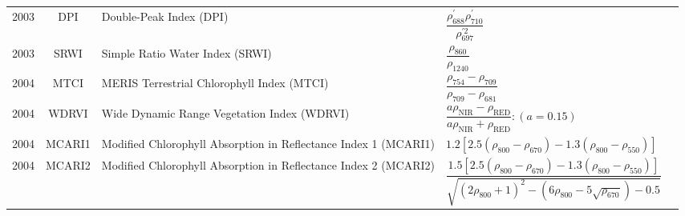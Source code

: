 \documentclass[10pt]{article}
\begin{document}
\begin{ThreePartTable}
\begin{longtable}{c c m{2.80in} M{2.80in} M{1.5in}}
  2003 & DPI     & Double-Peak Index (DPI)                                                        & $\dfrac{\rho^\prime_{688}\rho^\prime_{710}}{\rho^{\prime2}_{697}}$                                                                                                                                                                                                                      & \citet{Zarco-Tejada2003}                            \\
  2003 & SRWI    & Simple Ratio Water Index (SRWI)                                                & $\dfrac{\rho_{860}}{\rho_{1240}}$                                                                                                                                                                                                                                                       & \citet{Zarco-Tejada2003b}                           \\
  2004 & MTCI    & MERIS Terrestrial Chlorophyll Index (MTCI)                                     & $\dfrac{\rho_{754}-\rho_{709}}{\rho_{709}-\rho_{681}}$                                                                                                                                                                                                                                  & \citet{Dash2004}                                    \\
  2004 & WDRVI   & Wide Dynamic Range Vegetation Index (WDRVI)                                    & $\dfrac{a\rho_\text{NIR}-\rho_\text{RED}}{a\rho_\text{NIR}+\rho_\text{RED}} : (a=0.15)$                                                                                                                                                                                                 & \citet{Gitelson2004}                                    \\
  2004 & MCARI1  & Modified Chlorophyll Absorption in Reflectance Index 1 (MCARI1)                & $1.2[2.5(\rho_{800}-\rho_{670})-1.3(\rho_{800}-\rho_{550})]$                                                                                                                                                                                                                            & \citet{Haboudane2004}                               \\
  2004 & MCARI2  & Modified Chlorophyll Absorption in Reflectance Index 2 (MCARI2)                & $\dfrac{1.5[2.5(\rho_{800}-\rho_{670})-1.3(\rho_{800}-\rho_{550})]}{\sqrt{(2\rho_{800}+1)^2-(6\rho_{800}-5\sqrt{\rho_{670}})-0.5}}$                                                                                                                                                     & \citet{Haboudane2004}                               \\

\end{longtable}
\end{ThreePartTable}
\end{document}
